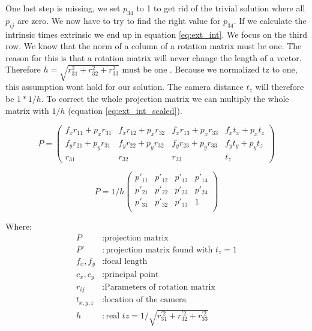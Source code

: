 \documentclass[11pt,a4paper,titlepage,oneside]{report}
\begin{document}
One last step is missing, we set $p_{34}$ to 1 to get rid of the trivial solution where all $p_{ij}$ are zero. We now have to try to find the right value for $p_{34}$. If we calculate the intrinsic times extrinsic we end up in equation \ref{eq:ext_int}. We focus on the third row. We know that the norm of a column of a rotation matrix must be one. The reason for this is that a rotation matrix will never change the length of a vector. Therefore $h=\sqrt{r_{31}^2+r_{32}^2+r_{33}^2}$ must be one \cite{Wu}. Because we normalized tz to one, this assumption wont hold for our solution. The camera distance $t_z$ will therefore be $1*1/h$. To correct the whole projection matrix we can multiply the whole matrix with $1/h$ (equation \ref{eq:ext_int_scaled}).

\begin{equation}\label{eq:ext_int}
	P=
	\begin{pmatrix}
		f_xr_{11}+p_xr_{31} & f_xr_{12}+p_xr_{32} & f_xr_{13}+p_xr_{33} & f_xt_x+p_xt_z\\
		f_yr_{21}+p_yr_{31} & f_yr_{22}+p_yr_{32} & f_yr_{23}+p_yr_{33} & f_yt_y+p_yt_z\\
		r_{31} & r_{32} & r_{33} & t_z
	\end{pmatrix}
\end{equation}

\begin{equation}\label{eq:ext_int_scaled}
	P=1/h
	\begin{pmatrix}
		p'_{11} & p'_{12} & p'_{13} & p'_{14}\\
		p'_{21} & p'_{22} & p'_{23} & p'_{24}\\
		p'_{31} & p'_{32} & p'_{33} & 1\\
	\end{pmatrix}
\end{equation}

Where:
\begin{align*}
	P					&: \text{projection matrix}\\
	P'				&: \text{projection matrix found with $t_z=1$}\\
	f_x,f_y		&: \text{focal length}\\
	c_x,c_y		&: \text{principal point}\\
	r_{ij}		&: \text{Parameters of rotation matrix}\\
	t_{x,y,z}	&: \text{location of the camera}\\
	h					&: \text{real $tz=1/\sqrt{r_{31}^{'2}+r_{32}^{'2}+r_{33}^{'2}}$}
\end{align*}
\end{document}
